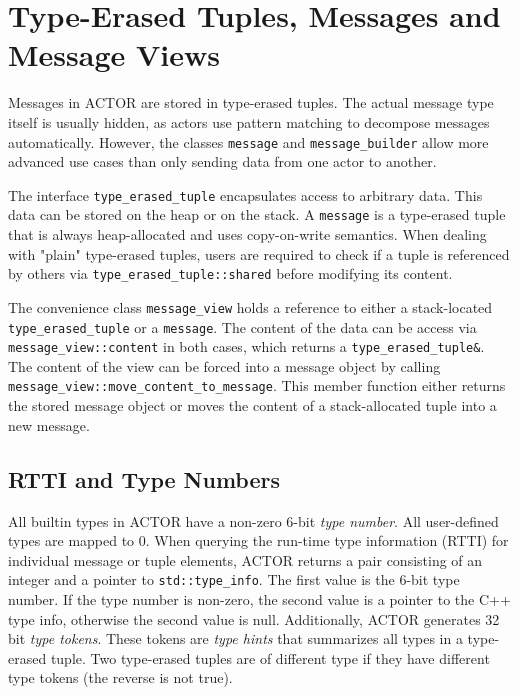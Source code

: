 \section{Type-Erased Tuples, Messages and Message Views}
\label{message}

Messages in ACTOR are stored in type-erased tuples. The actual message type
itself is usually hidden, as actors use pattern matching to decompose messages
automatically. However, the classes \lstinline^message^ and
\lstinline^message_builder^ allow more advanced use cases than only sending
data from one actor to another.

The interface \lstinline^type_erased_tuple^ encapsulates access to arbitrary
data. This data can be stored on the heap or on the stack. A
\lstinline^message^ is a type-erased tuple that is always heap-allocated and
uses copy-on-write semantics. When dealing with "plain" type-erased tuples,
users are required to check if a tuple is referenced by others via
\lstinline^type_erased_tuple::shared^ before modifying its content.

The convenience class \lstinline^message_view^ holds a reference to either a
stack-located \lstinline^type_erased_tuple^ or a \lstinline^message^. The
content of the data can be access via \lstinline^message_view::content^ in both
cases, which returns a \lstinline^type_erased_tuple&^. The content of the view
can be forced into a message object by calling
\lstinline^message_view::move_content_to_message^. This member function either
returns the stored message object or moves the content of a stack-allocated
tuple into a new message.

\subsection{RTTI and Type Numbers}

All builtin types in ACTOR have a non-zero 6-bit \emph{type number}. All
user-defined types are mapped to 0. When querying the run-time type information
(RTTI) for individual message or tuple elements, ACTOR returns a pair consisting
of an integer and a pointer to \lstinline^std::type_info^. The first value is
the 6-bit type number. If the type number is non-zero, the second value is a
pointer to the C++ type info, otherwise the second value is null. Additionally,
ACTOR generates 32 bit \emph{type tokens}. These tokens are \emph{type hints}
that summarizes all types in a type-erased tuple. Two type-erased tuples are of
different type if they have different type tokens (the reverse is not true).

